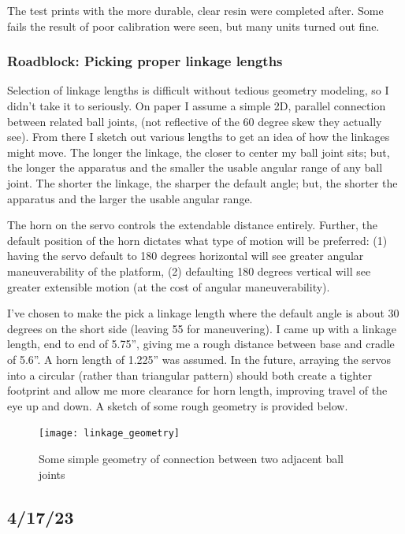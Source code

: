 \documentclass[a4paper, 10pt]{article}
\begin{document}
		The test prints with the more durable, clear resin were completed after. Some fails the result of poor calibration were seen, but many units turned out fine.
		
		\subsubsection{Roadblock: Picking proper linkage lengths}
		Selection of linkage lengths is difficult without tedious geometry modeling, so I didn't take it to seriously. On paper I assume a simple 2D, parallel connection between related ball joints, (not reflective of the 60 degree skew they actually see). From there I sketch out various lengths to get an idea of how the linkages might move. The longer the linkage, the closer to center my ball joint sits; but, the longer the apparatus and the smaller the usable angular range of any ball joint. The shorter the linkage, the sharper the default angle; but, the shorter the apparatus and the larger the usable angular range. 
		
		 The horn on the servo controls the extendable distance entirely. Further, the default position of the horn dictates what type of motion will be preferred: (1) having the servo default to 180 degrees horizontal will see greater angular maneuverability of the platform, (2) defaulting 180 degrees vertical will see greater extensible motion (at the cost of angular maneuverability). 
		
		I've chosen to make the pick a linkage length where the default angle is about 30 degrees on the short side (leaving 55 for maneuvering). I came up with a linkage length, end to end of 5.75'', giving me a rough distance between base and cradle of 5.6''. A horn length of 1.225'' was assumed. In the future, arraying the servos into a circular (rather than triangular pattern) should both create a tighter footprint and allow me more clearance for horn length, improving travel of the eye up and down. A sketch of some rough geometry is provided below. 
		
		\begin{figure} [!h]
			\centering
			\texttt{[image: linkage\_geometry]}
			\caption{Some simple geometry of connection between two adjacent ball joints}
			\label{linkage_geometry}
		\end{figure}

	\subsection{4/17/23}
\end{document}
